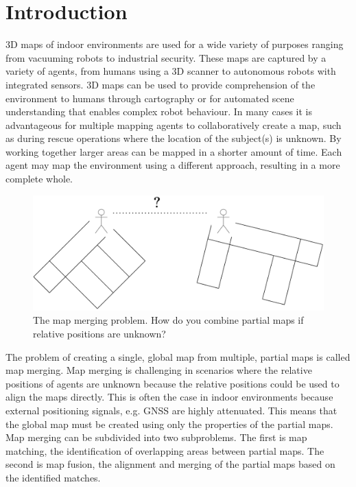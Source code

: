 
\section{Introduction}

3D maps of indoor environments are used for a wide variety of purposes ranging from vacuuming robots to industrial security. These maps are captured by a variety of agents, from humans using a 3D scanner to autonomous robots with integrated sensors. 3D maps can be used to provide comprehension of the environment to humans through cartography or for automated scene understanding that enables complex robot behaviour. In many cases it is advantageous for multiple mapping agents to collaboratively create a map, such as during rescue operations where the location of the subject(s) is unknown. By working together larger areas can be mapped in a shorter amount of time. Each agent may map the environment using a different approach, resulting in a more complete whole.

\begin{figure}[h]
    \centering
    \includegraphics*[width=.7\textwidth]{./fig/overview_diagrams-Page-4.drawio.pdf}
    \caption{The map merging problem. How do you combine partial maps if relative positions are unknown?}
    \label{fig:map_merging}
\end{figure}

The problem of creating a single, global map from multiple, partial maps is called map merging. Map merging is challenging in scenarios where the relative positions of agents are unknown because the relative positions could be used to align the maps directly. This is often the case in indoor environments because external positioning signals, e.g. GNSS are highly attenuated. This means that the global map must be created using only the properties of the partial maps. Map merging can be subdivided into two subproblems. The first is map matching, the identification of overlapping areas between partial maps. The second is map fusion, the alignment and merging of the partial maps based on the identified matches. 

